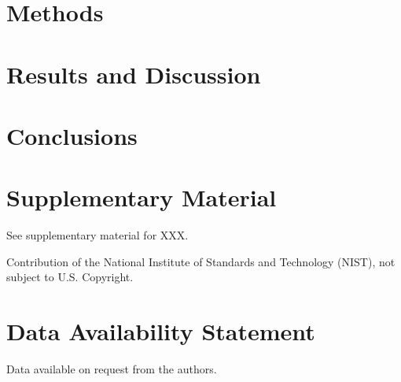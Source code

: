 \documentclass[%
 aip,
 amsmath,amssymb,
 reprint,%
]{revtex4-1}
\begin{document}
\section{Methods}\label{sec:methods}

\section{Results and Discussion}\label{sec:results}

\section{Conclusions}\label{sec:conclusions}

\section*{Supplementary Material}

See supplementary material for XXX. 

\begin{acknowledgments}

Contribution of the National Institute of Standards and Technology (NIST), not subject to U.S. Copyright. 

\end{acknowledgments}

\section*{Data Availability Statement}

Data available on request from the authors.


%
\end{document}
